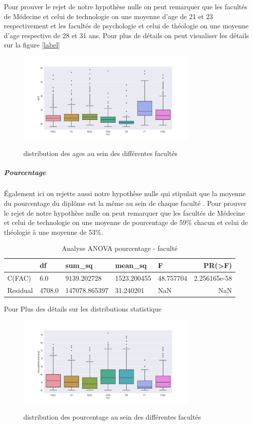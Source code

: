  Pour prouver le rejet de notre hypothèse nulle on peut remarquer que les
 facultés de Médecine et celui de technologie on une moyenne d'age de 21
 et 23 respectivement et les facultés de psychologie et celui de
 théologie on une moyenne d'age respective de 28 et 31 ans.
 Pour plus de détails on peut visualiser les détails sur la figure \ref{label}
 	\begin{figure}[!htbp]
 	\centering
 	\includegraphics[width=0.8\textwidth]{fig/AGE-FAC.png}\label{fig:ANOVAb}
 	\caption[Short caption]{distribution des ages au sein des différentes facultés } 
 	\end{figure}
\subparagraph{Pourcentage}
  Également ici on rejette aussi notre hypothèse nulle qui stipulait que la
moyenne du pourcentage du diplôme est la même au sein de chaque faculté
. Pour prouver le rejet de notre hypothèse nulle on peut remarquer que
les facultés de Médecine et celui de technologie on une moyenne de
pourcentage de 59\% chacun et celui de théologie à une moyenne de 53\%.
\begin{table}[!htbp]
	\centering
	\begingroup %
	\captionsetup{type=table} %
	\caption{Analyse ANOVA pourcentage - faculté}
	\label{tab:ANOVAPourcentage}
	\begin{tabular}{lllllr}
		\toprule
		{} & df     &   sum\_sq &     mean\_sq      &     F    &     PR(>F) \\
		\midrule
		C(FAC)    &   6.0  &  9139.202728  &1523.200455  &48.757704&  2.256165e-58 \\
		Residual & 4708.0 & 147078.865397 &   31.240201  &      NaN      &     NaN \\
		\bottomrule
	\end{tabular}
	\endgroup
\end{table}
Pour Plus des détails sur les distributions statistique 
\begin{figure}[!htbp]
	\centering
	\includegraphics[width=0.8\textwidth]{fig/AGE-POURC.png}\label{fig:ANOVAa}
	\caption[Short caption]{distribution des pourcentage au sein des différentes facultés } 
\end{figure}

